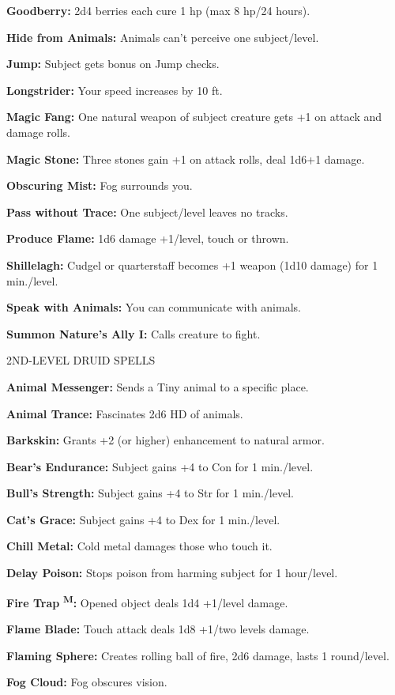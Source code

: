 \documentclass{article}
\begin{document}
\textbf{Goodberry:} 2d4 berries each cure 1 hp (max 8 hp/24 hours).

\textbf{Hide from Animals:} Animals can't perceive one subject/level.

\textbf{Jump:} Subject gets bonus on Jump checks.

\textbf{Longstrider:} Your speed increases by 10 ft.

\textbf{Magic Fang:} One natural weapon of subject creature gets +1 on attack and 
damage rolls.

\textbf{Magic Stone:} Three stones gain +1 on attack rolls, deal 1d6+1 damage.

\textbf{Obscuring Mist:} Fog surrounds you.

\textbf{Pass without Trace:} One subject/level leaves no tracks.

\textbf{Produce Flame:} 1d6 damage +1/level, touch or thrown.

\textbf{Shillelagh:} Cudgel or quarterstaff becomes +1 weapon (1d10 damage) for 
1 min./level.

\textbf{Speak with Animals:} You can communicate with animals.

\textbf{Summon Nature's Ally I:} Calls creature to fight.

2ND-LEVEL DRUID SPELLS

\textbf{Animal Messenger:} Sends a Tiny animal to a specific place.

\textbf{Animal Trance:} Fascinates 2d6 HD of animals.

\textbf{Barkskin:} Grants +2 (or higher) enhancement to natural armor.

\textbf{Bear's Endurance:} Subject gains +4 to Con for 1 min./level.

\textbf{Bull's Strength:} Subject gains +4 to Str for 1 min./level.

\textbf{Cat's Grace:} Subject gains +4 to Dex for 1 min./level.

\textbf{Chill Metal:} Cold metal damages those who touch it.

\textbf{Delay Poison:} Stops poison from harming subject for 1 hour/level.

\textbf{Fire Trap }\textsuperscript{\textbf{M}}\textbf{:} Opened object deals 1d4 
+1/level damage.

\textbf{Flame Blade:} Touch attack deals 1d8 +1/two levels damage.

\textbf{Flaming Sphere:} Creates rolling ball of fire, 2d6 damage, lasts 1 round/level.

\textbf{Fog Cloud:} Fog obscures vision.
\end{document}
